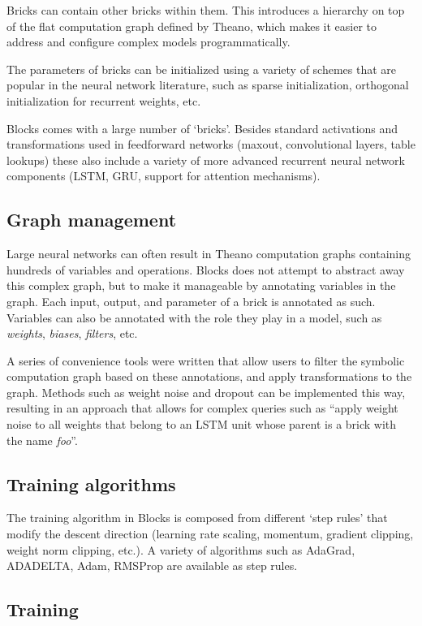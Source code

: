 \documentclass[twoside,11pt]{article}
\begin{document}
Bricks can contain other bricks within them. This introduces a hierarchy on top
of the flat computation graph defined by Theano, which makes it easier to
address and configure complex models programmatically.

The parameters of bricks can be initialized using a variety of schemes that are
popular in the neural network literature, such as sparse initialization,
orthogonal initialization for recurrent weights, etc.

Blocks comes with a large number of `bricks'. Besides standard activations and
transformations used in feedforward networks (maxout, convolutional layers,
table lookups) these also include a variety of more advanced recurrent neural
network components (LSTM, GRU, support for attention mechanisms).

\subsection{Graph management}

Large neural networks can often result in Theano computation graphs containing
hundreds of variables and operations. Blocks does not attempt to abstract away
this complex graph, but to make it manageable by annotating variables in the
graph. Each input, output, and parameter of a brick is annotated as such.
Variables can also be annotated with the role they play in a model, such as
\emph{weights}, \emph{biases}, \emph{filters}, etc.

A series of convenience tools were written that allow users to filter the
symbolic computation graph based on these annotations, and apply transformations
to the graph. Methods such as weight noise and dropout can be implemented this
way, resulting in an approach that allows for complex queries such as ``apply
weight noise to all weights that belong to an LSTM unit whose parent is a brick
with the name \emph{foo}''.

\subsection{Training algorithms}

The training algorithm in Blocks is composed from different `step
rules' that modify the descent direction (learning
rate scaling, momentum, gradient clipping, weight norm
clipping, etc.). A variety of algorithms such as AdaGrad, ADADELTA, Adam,
RMSProp are available as step rules.

\subsection{Training}
\end{document}
